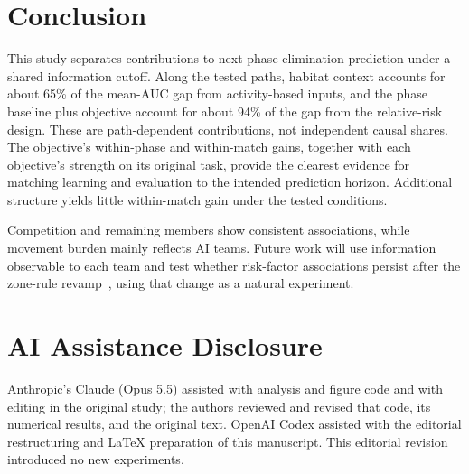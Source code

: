 \documentclass[sigconf,anonymous,nonacm]{acmart}
\begin{document}
\section{Conclusion}
\label{sec:conclusion}
This study separates contributions to next-phase elimination prediction under a shared information cutoff. Along the tested paths, habitat context accounts for about 65\% of the mean-AUC gap from activity-based inputs, and the phase baseline plus objective account for about 94\% of the gap from the relative-risk design. These are path-dependent contributions, not independent causal shares. The objective's within-phase and within-match gains, together with each objective's strength on its original task, provide the clearest evidence for matching learning and evaluation to the intended prediction horizon. Additional structure yields little within-match gain under the tested conditions.

Competition and remaining members show consistent associations, while movement burden mainly reflects AI teams. Future work will use information observable to each team and test whether risk-factor associations persist after the zone-rule revamp~\cite{PUBGBlueZone2026}, using that change as a natural experiment.

\section*{AI Assistance Disclosure}
Anthropic's Claude (Opus 5.5) assisted with analysis and figure code and with editing in the original study; the authors reviewed and revised that code, its numerical results, and the original text. OpenAI Codex assisted with the editorial restructuring and LaTeX preparation of this manuscript. This editorial revision introduced no new experiments.



\end{document}
